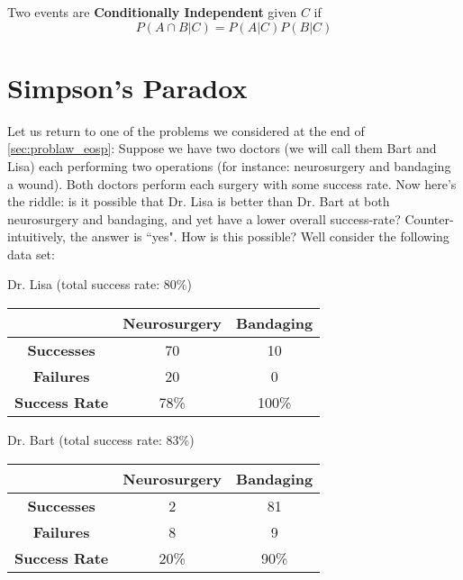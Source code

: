 \documentclass{report}
\begin{document}
Two events are \textbf{Conditionally Independent} given $C$ if 
\[
    P(A\cap B | C)= P(A|C)P(B|C)
\]

\todo

\newpage








\section{Simpson's Paradox}
Let us return to one of the problems we considered at the end of \ref{sec:problaw_eosp}: Suppose we have two doctors (we will call them Bart and Lisa) each performing two operations (for instance: neurosurgery and bandaging a wound). Both doctors perform each surgery with some success rate. Now here's the riddle: is it possible that Dr. Lisa is better than Dr. Bart at both neurosurgery and bandaging, and yet have a lower overall success-rate? Counter-intuitively, the answer is ``yes". How is this possible? Well consider the following data set:
\vspace{15px}
\begin{center}
Dr. Lisa (total success rate: 80\%)\\
\vspace{5px}
\begin{tabular}{c|cc }
& \textbf{Neurosurgery} & \textbf{Bandaging} \\ 
\hline
\textbf{Successes} & 70 & 10 \\  
\textbf{Failures} & 20 & 0 \\
\hline
\textbf{Success Rate} & 78\% & 100\% 
\end{tabular}
\end{center}

\vspace{15px}
\begin{center}
Dr. Bart (total success rate: 83\%)\\
\vspace{5px}
\begin{tabular}{c|cc}
&\textbf{Neurosurgery} & \textbf{Bandaging} \\ 
\hline
\textbf{Successes} & 2 & 81 \\  
\textbf{Failures} & 8 & 9 \\
\hline
\textbf{Success Rate} & 20\% & 90\% 
\end{tabular}
\vspace{15px}
\end{center}
\end{document}
